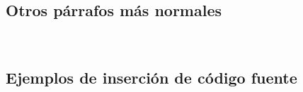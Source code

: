 	\lipsum[115] \\
	
	\lipsum[116]

\subsection{Otros párrafos más normales}

	\lipsum[7] \\
	
	\lipsum[2]


	\lipsum[4]

	\begin{multicols}{2}

		\lipsum[4]

		
		\lipsum[5]

	\end{multicols}

\subsection{Ejemplos de inserción de código fuente}

	\newcommand{\insertsrcmanual}[2]{\href{https://latex.ppizarror.com/informe.html?srctype=#1\#hlp-srccode}{#2}}

